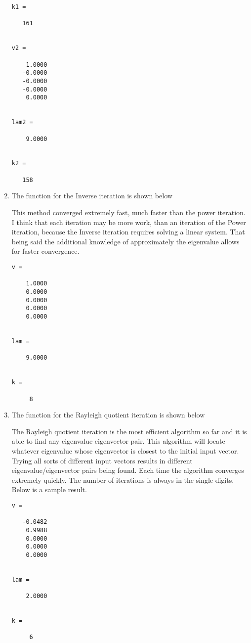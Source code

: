 \documentclass[11pt]{article}
\begin{document}
\begin{enumerate}
\begin{verbatim}
k1 =

   161


v2 =

    1.0000
   -0.0000
   -0.0000
   -0.0000
    0.0000


lam2 =

    9.0000


k2 =

   158
        \end{verbatim}

    \item %
        The function for the Inverse iteration is shown below
        
        

        This method converged extremely fast, much faster than the power
        iteration.
        I think that each iteration may be more work, than an iteration of the
        Power iteration, because the Inverse iteration requires solving a linear
        system.
        That being said the additional knowledge of approximately the eigenvalue
        allows for faster convergence.
        \begin{verbatim}
v =

    1.0000
    0.0000
    0.0000
    0.0000
    0.0000


lam =

    9.0000


k =

     8
        \end{verbatim}

    \item %
        The function for the Rayleigh quotient iteration is shown below
        
        

        The Rayleigh quotient iteration is the most efficient
        algorithm so far and it is able to find any eigenvalue
        eigenvector pair.
        This algorithm will locate whatever eigenvalue whose eigenvector
        is closest to the initial input vector.
        Trying all sorts of different input vectors results in different
        eigenvalue/eigenvector pairs being found.
        Each time the algorithm converges extremely quickly.
        The number of iterations is always in the single digits.
        Below is a sample result.
        \begin{verbatim}
v =

   -0.0482
    0.9988
    0.0000
    0.0000
    0.0000


lam =

    2.0000


k =

     6
        \end{verbatim}

\end{enumerate}
\end{document}
